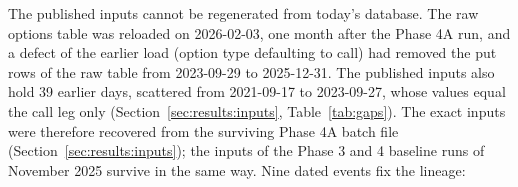 The published inputs cannot be regenerated from today's database. The raw options table was reloaded on 2026-02-03, one month after the Phase 4A run, and a defect of the earlier load (option type defaulting to call) had removed the put rows of the raw table from 2023-09-29 to 2025-12-31. The published inputs also hold 39 earlier days, scattered from 2021-09-17 to 2023-09-27, whose values equal the call leg only (Section~\ref{sec:results:inputs}, Table~\ref{tab:gaps}). %
The exact inputs were therefore recovered from the surviving Phase 4A batch file (Section~\ref{sec:results:inputs}); the inputs of the Phase 3 and 4 baseline runs of November 2025 survive in the same way. Nine dated events fix the lineage:
